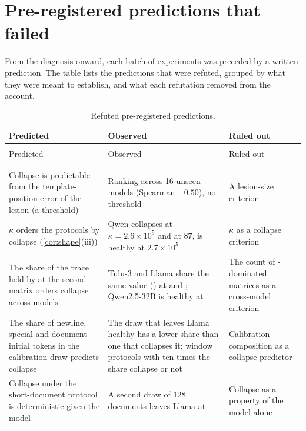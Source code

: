 \section{Pre-registered predictions that failed}
\label{app:negative}
From the diagnosis onward, each batch of experiments was preceded by a written prediction.
The table lists the predictions that were refuted, grouped by what they were meant to establish, and what each refutation removed from the account.
\begin{center}
\footnotesize\renewcommand{\arraystretch}{0.95}\setlength{\tabcolsep}{4pt}
\begin{longtable}{>{\raggedright\arraybackslash}p{4.2cm}>{\raggedright\arraybackslash}p{5.2cm}>{\raggedright\arraybackslash}p{3.6cm}}
\caption{Refuted pre-registered predictions.}\label{tab:negative}\\
\toprule
Predicted & Observed & Ruled out \\
\midrule
\endfirsthead
\multicolumn{3}{l}{\footnotesize\Cref{tab:negative}, continued}\\
\toprule
Predicted & Observed & Ruled out \\
\midrule
\endhead
\midrule
\multicolumn{3}{r}{\footnotesize continued on the next page}\\
\endfoot
\bottomrule
\endlastfoot
\addlinespace[3pt]\multicolumn{3}{l}{\emph{What predicts collapse}} \\\addlinespace[1pt]
Collapse is predictable from the template-position error of the lesion (a threshold) & Ranking across 16 unseen models (Spearman $-0.50$), no threshold & A lesion-size criterion \\
$\kappa$ orders the protocols by collapse (\cref{cor:shape}(iii)) & Qwen collapses at $\kappa=2.6\times10^{5}$ and at $87$, is healthy at $2.7\times10^{5}$ & $\kappa$ as a collapse criterion \\
The share of the trace held by \bos{} at the second matrix orders collapse across models & Tulu-3 and Llama share the same value (\AbosZero{}) at \TuluIF{} and \LgptqIF{}; Qwen2.5-32B is healthy at \AbosQthirtytwo{} & The count of \bos{}-dominated matrices as a cross-model criterion \\
The share of newline, special and document-initial tokens in the calibration draw predicts collapse & The draw that leaves Llama healthy has a lower share than one that collapses it; window protocols with ten times the share collapse or not & Calibration composition as a collapse predictor \\
Collapse under the short-document protocol is deterministic given the model & A second draw of 128 documents leaves Llama at \LgptqSeedIF{} & Collapse as a property of the model alone \\

\end{longtable}
\end{center}
